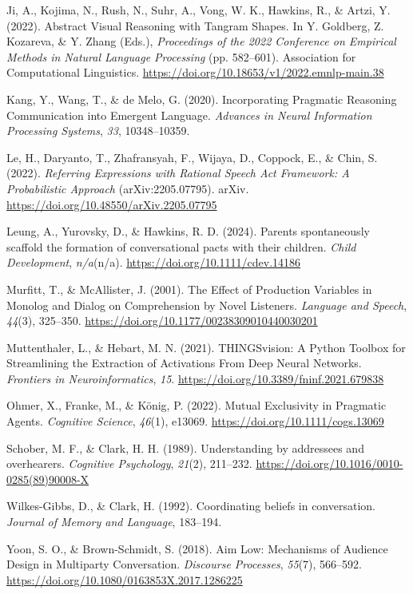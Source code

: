 \documentclass[10pt, letterpaper]{article}
\begin{document}
\begin{CSLReferences}{1}{0}
Ji, A., Kojima, N., Rush, N., Suhr, A., Vong, W. K., Hawkins, R., \&
Artzi, Y. (2022). Abstract {Visual Reasoning} with {Tangram Shapes}. In
Y. Goldberg, Z. Kozareva, \& Y. Zhang (Eds.), \emph{Proceedings of the
2022 {Conference} on {Empirical Methods} in {Natural Language
Processing}} (pp. 582--601). Association for Computational Linguistics.
\url{https://doi.org/10.18653/v1/2022.emnlp-main.38}

Kang, Y., Wang, T., \& de Melo, G. (2020). Incorporating {Pragmatic
Reasoning Communication} into {Emergent Language}. \emph{Advances in
{Neural Information Processing Systems}}, \emph{33}, 10348--10359.

Le, H., Daryanto, T., Zhafransyah, F., Wijaya, D., Coppock, E., \& Chin,
S. (2022). \emph{Referring {Expressions} with {Rational Speech Act
Framework}: {A Probabilistic Approach}} (arXiv:2205.07795). arXiv.
\url{https://doi.org/10.48550/arXiv.2205.07795}

Leung, A., Yurovsky, D., \& Hawkins, R. D. (2024). Parents spontaneously
scaffold the formation of conversational pacts with their children.
\emph{Child Development}, \emph{n/a}(n/a).
\url{https://doi.org/10.1111/cdev.14186}

Murfitt, T., \& McAllister, J. (2001). The {Effect} of {Production
Variables} in {Monolog} and {Dialog} on {Comprehension} by {Novel
Listeners}. \emph{Language and Speech}, \emph{44}(3), 325--350.
\url{https://doi.org/10.1177/00238309010440030201}

Muttenthaler, L., \& Hebart, M. N. (2021). {THINGSvision}: {A Python
Toolbox} for {Streamlining} the {Extraction} of {Activations From Deep
Neural Networks}. \emph{Frontiers in Neuroinformatics}, \emph{15}.
\url{https://doi.org/10.3389/fninf.2021.679838}

Ohmer, X., Franke, M., \& König, P. (2022). Mutual {Exclusivity} in
{Pragmatic Agents}. \emph{Cognitive Science}, \emph{46}(1), e13069.
\url{https://doi.org/10.1111/cogs.13069}

Schober, M. F., \& Clark, H. H. (1989). Understanding by addressees and
overhearers. \emph{Cognitive Psychology}, \emph{21}(2), 211--232.
\url{https://doi.org/10.1016/0010-0285(89)90008-X}

Wilkes-Gibbs, D., \& Clark, H. (1992). Coordinating beliefs in
conversation. \emph{Journal of Memory and Language}, 183--194.

Yoon, S. O., \& Brown-Schmidt, S. (2018). Aim {Low}: {Mechanisms} of
{Audience Design} in {Multiparty Conversation}. \emph{Discourse
Processes}, \emph{55}(7), 566--592.
\url{https://doi.org/10.1080/0163853X.2017.1286225}

\end{CSLReferences}


\end{document}
